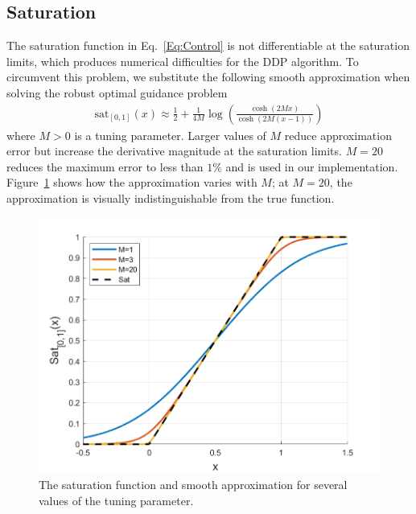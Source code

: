 \subsection{Saturation}
The saturation function in Eq.~\eqref{Eq:Control} is not differentiable at the  saturation limits, which produces numerical difficulties for the DDP algorithm. To circumvent this problem, we substitute the following smooth approximation when solving the robust optimal guidance problem
\begin{align*}
	\mathrm{sat}_{[0,1]}(x) \approx \frac{1}{2} + \frac{1}{4M}\log\left(\frac{\cosh (2Mx)}{\cosh (2M(x-1))}\right) 
\end{align*}
where $M>0$ is a tuning parameter. Larger values of $M$ reduce approximation error but increase the derivative magnitude at the saturation limits. $M=20$ reduces the maximum error to less than $1\%$ and is used in our implementation. Figure~\ref{Fig:SmoothSat} shows how the approximation varies with $M$; at $M=20$, the approximation is visually indistinguishable from the true function.
\begin{figure}[h!]
	\centering
	\includegraphics[width=1\textwidth]{Images/SmoothSat}
	\caption{The saturation function and smooth approximation for several values of the tuning parameter.}
	\label{Fig:SmoothSat}
\end{figure}



